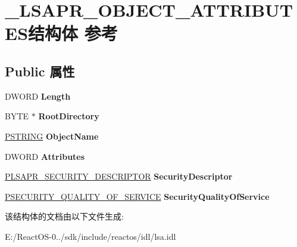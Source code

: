 \hypertarget{struct___l_s_a_p_r___o_b_j_e_c_t___a_t_t_r_i_b_u_t_e_s}{}\section{\+\_\+\+L\+S\+A\+P\+R\+\_\+\+O\+B\+J\+E\+C\+T\+\_\+\+A\+T\+T\+R\+I\+B\+U\+T\+E\+S结构体 参考}
\label{struct___l_s_a_p_r___o_b_j_e_c_t___a_t_t_r_i_b_u_t_e_s}
\subsection*{Public 属性}
\begin{DoxyCompactItemize}
\item 
\mbox{\label{struct___l_s_a_p_r___o_b_j_e_c_t___a_t_t_r_i_b_u_t_e_s_ab265fcbaf28f39d199a0aec767b339e0}} 
D\+W\+O\+RD {\bfseries Length}
\item 
\mbox{\label{struct___l_s_a_p_r___o_b_j_e_c_t___a_t_t_r_i_b_u_t_e_s_a3f77e9220d2bf5ea1f7ef32928a7452b}} 
B\+Y\+TE $\ast$ {\bfseries Root\+Directory}
\item 
\mbox{\label{struct___l_s_a_p_r___o_b_j_e_c_t___a_t_t_r_i_b_u_t_e_s_a195c8b518c625d809ee5595ae7fa4640}} 
\hyperlink{struct___s_t_r_i_n_g}{P\+S\+T\+R\+I\+NG} {\bfseries Object\+Name}
\item 
\mbox{\label{struct___l_s_a_p_r___o_b_j_e_c_t___a_t_t_r_i_b_u_t_e_s_a58871b5f6217e5cfeaa8167c547b1802}} 
D\+W\+O\+RD {\bfseries Attributes}
\item 
\mbox{\label{struct___l_s_a_p_r___o_b_j_e_c_t___a_t_t_r_i_b_u_t_e_s_ab0578587bcb0623254ae238e57a403cb}} 
\hyperlink{struct___l_s_a_p_r___s_e_c_u_r_i_t_y___d_e_s_c_r_i_p_t_o_r}{P\+L\+S\+A\+P\+R\+\_\+\+S\+E\+C\+U\+R\+I\+T\+Y\+\_\+\+D\+E\+S\+C\+R\+I\+P\+T\+OR} {\bfseries Security\+Descriptor}
\item 
\mbox{\label{struct___l_s_a_p_r___o_b_j_e_c_t___a_t_t_r_i_b_u_t_e_s_af933c5541c5f95aaeac1786991ccdc35}} 
\hyperlink{struct___s_e_c_u_r_i_t_y___q_u_a_l_i_t_y___o_f___s_e_r_v_i_c_e}{P\+S\+E\+C\+U\+R\+I\+T\+Y\+\_\+\+Q\+U\+A\+L\+I\+T\+Y\+\_\+\+O\+F\+\_\+\+S\+E\+R\+V\+I\+CE} {\bfseries Security\+Quality\+Of\+Service}
\end{DoxyCompactItemize}


该结构体的文档由以下文件生成\+:\begin{DoxyCompactItemize}
\item 
E\+:/\+React\+O\+S-\/0../sdk/include/reactos/idl/lsa.\+idl\end{DoxyCompactItemize}
